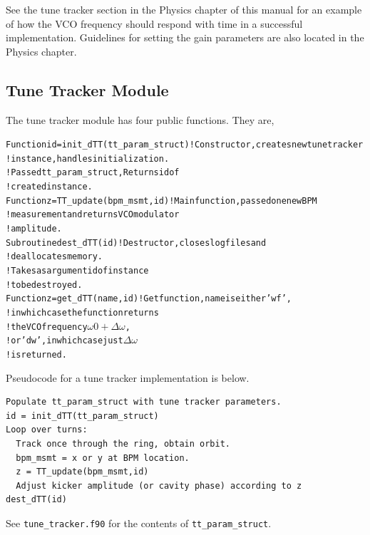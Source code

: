See the tune tracker section in the Physics chapter of this manual for
an example of how the VCO frequency should respond with time in a
successful implementation.  Guidelines for setting the gain parameters
are also located in the Physics chapter.

\subsection{Tune Tracker Module}

The tune tracker module has four public functions.  They are,
\begin{alltt}
Function id = init_dTT(tt_param_struct)     !Constructor, creates new tune tracker 
                                            !instance, handles initialization.
                                            !Passed tt_param_struct, Returns id of 
                                            !created instance.
Function z = TT_update(bpm_msmt,id)         !Main function, passed one new BPM 
                                            !measurement and returns VCO modulator 
                                            !amplitude.
Subroutine dest_dTT(id)                     !Destructor, closes log files and 
                                            !deallocates memory.
                                            !Takes as argument id of instance 
                                            !to be destroyed.
Function z = get_dTT(name,id)               !Get function, name is either 'wf', 
                                            !in which case the function returns 
                                            !the VCO frequency \(\omega0+\Delta\omega\), 
                                            !or 'dw', in which case just \(\Delta\omega\)
                                            !is returned.
\end{alltt}

Pseudocode for a tune tracker implementation is below.
\begin{verbatim}
Populate tt_param_struct with tune tracker parameters.
id = init_dTT(tt_param_struct)
Loop over turns:
  Track once through the ring, obtain orbit.
  bpm_msmt = x or y at BPM location.
  z = TT_update(bpm_msmt,id)
  Adjust kicker amplitude (or cavity phase) according to z
dest_dTT(id)
\end{verbatim}

See {\tt tune\_tracker.f90} for the contents of {\tt tt\_param\_struct}.

